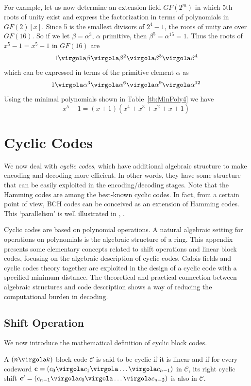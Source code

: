 For example, let us now determine an extension field \(GF(2^m)\) in which 5th roots of unity exist and express the factorization in terms of polynomials in \(GF(2)[x]\). Since 5 is the smallest divisors of \(2^4-1\), the roots of unity are over \(GF(16)\). So if we let \(\beta=\alpha^3\), \(\alpha\) primitive, then \(\beta^5=\alpha^15=1\). Thus the roots of \(x^5-1=x^5+1\) in \(GF(16)\) are
\[
1 \virgola \beta \virgola \beta^2 \virgola \beta^3 \virgola \beta^4
\]
which can be expressed in terms of the primitive element \(\alpha\) as
\[
1 \virgola \alpha^3 \virgola \alpha^6 \virgola \alpha^9 \virgola \alpha^{12}
\]
Using the minimal polynomials shown in Table~\ref{tb:MinPoly4} we have
\[
x^5-1=(x+1)(x^4+x^3+x^2+x+1)
\]

\chapter{Cyclic Codes}

We now deal with \emph{cyclic codes}, which have additional algebraic structure to make encoding and decoding more efficient. In other words, they have some structure that can be easily exploited in the encoding/decoding stages. Note that the Hamming codes are among the best-known cyclic codes. In fact, from a certain point of view, BCH codes can be conceived as an extension of Hamming codes. This `parallelism' is well illustrated in \cite{b:wicker}, \cite{b:mcwilliams}.

Cyclic codes are based on polynomial operations. A natural algebraic setting for operations on polynomials is the algebraic structure of a ring.
This appendix presents some elementary concepts related to shift operations and linear block codes, focusing on the algebraic description of cyclic codes. Galois fields and cyclic codes theory together are exploited in the design of a cyclic code with a specified minimum distance. The theoretical and practical connection between algebraic structures and code description shows a way of reducing the computational burden in decoding.

\section{Shift Operation} \label{sec:shift}
We now introduce the mathematical definition of cyclic block codes.
\begin{Def}
A \( (n \virgola k) \) block code $\mathcal C$ is said to be cyclic if it is linear and if for every codeword \( \vet{c}=(c_0 \virgola c_1 \virgola \ldots \virgola c_{n-1}) \) in $\mathcal C$, its right cyclic shift \( \vet{c'}=(c_{n-1} \virgola c_0 \virgola \ldots \virgola c_{n-2}) \) is also in \( \mathcal C \).
\end{Def}

